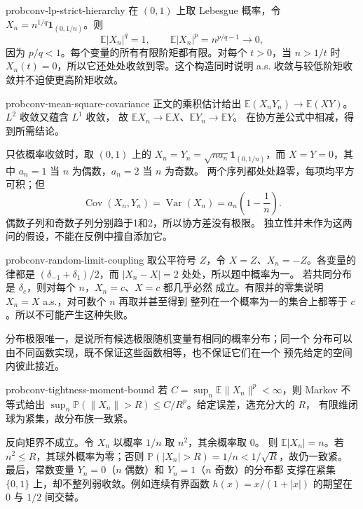 \begin{solution}{probconv-lp-strict-hierarchy}
在 $(0,1)$ 上取 Lebesgue 概率，令
$X_n=n^{1/q}\mathbf1_{(0,1/n)}$。则
\[
 \mathbb E|X_n|^q=1,\qquad
 \mathbb E|X_n|^p=n^{p/q-1}\longrightarrow0,
\]
因为 $p/q<1$。每个变量的所有有限阶矩都有限。对每个 $t>0$，当
$n>1/t$ 时 $X_n(t)=0$，所以它还处处收敛到零。这个构造同时说明
a.s. 收敛与较低阶矩收敛并不迫使更高阶矩收敛。
\end{solution}

\begin{solution}{probconv-mean-square-covariance}
正文的乘积估计给出
$\mathbb E(X_nY_n)\to\mathbb E(XY)$。$L^2$ 收敛又蕴含 $L^1$ 收敛，
故 $\mathbb E X_n\to\mathbb E X$、$\mathbb E Y_n\to\mathbb E Y$。
在协方差公式中相减，得到所需结论。

只依概率收敛时，取 $(0,1)$ 上的
$X_n=Y_n=\sqrt{na_n}\mathbf1_{(0,1/n)}$，而 $X=Y=0$，其中
$a_n=1$ 当 $n$ 为偶数，$a_n=2$ 当 $n$ 为奇数。
两个序列都处处趋零，每项均平方可积；但
\[
 \operatorname{Cov}(X_n,Y_n)=\operatorname{Var}(X_n)
 =a_n\left(1-\frac1n\right).
\]
偶数子列和奇数子列分别趋于1和2，所以协方差没有极限。
独立性并未作为这两问的假设，不能在反例中擅自添加它。
\end{solution}

\begin{solution}{probconv-random-limit-coupling}
取公平符号 $Z$，令 $X=Z$、$X_n=-Z$。各变量的律都是
$(\delta_{-1}+\delta_1)/2$，而 $|X_n-X|=2$ 处处，所以题中概率为一。
若共同分布是 $\delta_c$，则对每个 $n$，$X_n=c$、$X=c$ 都几乎必然
成立。有限并的零集说明 $X_n=X$ a.s.，对可数个 $n$ 再取并甚至得到
整列在一个概率为一的集合上都等于 $c$。所以不可能产生这种失败。

分布极限唯一，是说所有候选极限随机变量有相同的概率分布；同一个
分布可以由不同函数实现，既不保证这些函数相等，也不保证它们在一个
预先给定的空间内彼此接近。
\end{solution}

\begin{solution}{probconv-tightness-moment-bound}
若 $C=\sup_n\mathbb E\|X_n\|^p<\infty$，则 Markov 不等式给出
$\sup_n\mathbb P(\|X_n\|>R)\le C/R^p$。给定误差，选充分大的 $R$，
有限维闭球为紧集，故分布族一致紧。

反向矩界不成立。令 $X_n$ 以概率 $1/n$ 取 $n^2$，其余概率取 $0$。
则 $\mathbb E|X_n|=n$。若 $n^2\le R$，其球外概率为零；否则
$\mathbb P(|X_n|>R)=1/n<1/\sqrt R$，故仍一致紧。
最后，常数变量 $Y_n=0$（$n$ 偶数）和 $Y_n=1$（$n$ 奇数）的分布都
支撑在紧集 $\{0,1\}$ 上，却不整列弱收敛。例如连续有界函数
$h(x)=x/(1+|x|)$ 的期望在 $0$ 与 $1/2$ 间交替。
\end{solution}

